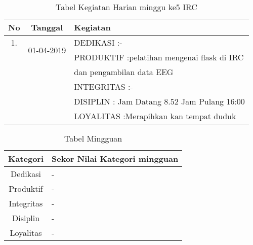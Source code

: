 \begin{table}[h]
\caption{Tabel Kegiatan Harian minggu ke5 IRC}
\centering
\begin{tabular}{|c|c|l|}
\hline
No&Tanggal&Kegiatan\\
\hline
1.&\multirow{2}{*}{01-04-2019}
&DEDIKASI :-\\
&&PRODUKTIF :pelatihan mengenai flask di IRC\\
&&dan pengambilan data EEG\\
&&INTEGRITAS :-\\
&&DISIPLIN : Jam Datang 8.52 Jam Pulang 16:00\\
&&LOYALITAS :Merapihkan kan tempat duduk\\
\hline
\end{tabular}
\label{table:contoh}
\end{table}


\begin{table}[h]
\begin{center}
\caption{Tabel Mingguan}
\begin{tabular}{|c|l|}
\hline
Kategori& Sekor Nilai Kategori mingguan\\
\hline
Dedikasi & -\\
\hline
Produktif & -\\
\hline
Integritas & -\\
\hline
Disiplin & -\\
\hline
Loyalitas & -\\
\hline
\end{tabular}
\end{center}
\label {Tabel:contoh} 
\end{table}
